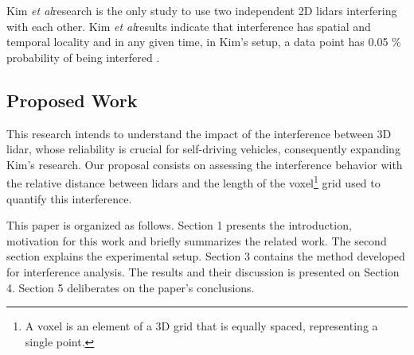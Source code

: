\documentclass[extendedabs]{recpad2k}
\def\etal{\emph{et al}\bmvaOneDot}
\begin{document}
Kim \etal research %
is the only study to use two independent 2D \gls{lidar}s interfering with each other. Kim \etal results indicate that interference has spatial and temporal locality \cite{Kim2015} and in any given time, in Kim's setup, a data point has 0.05 \% probability of being interfered \cite{Kim2015}.


\subsection{Proposed Work}
This research intends to understand the impact of the interference between 3D \gls{lidar}, whose reliability is crucial for self-driving vehicles, consequently expanding Kim's research.
Our proposal consists on assessing the interference behavior with the relative distance between \gls{lidar}s and the length of the voxel\footnote{A voxel is an element of a 3D grid that is equally spaced, representing a single point.} grid used to quantify this interference.

This paper is organized as follows. Section 1 presents the introduction, motivation for this work and briefly summarizes the related work. The second section explains the experimental setup. Section 3 contains the method developed for interference analysis. The results and their discussion is presented on Section 4. Section 5 deliberates on the paper's conclusions.




\end{document}
